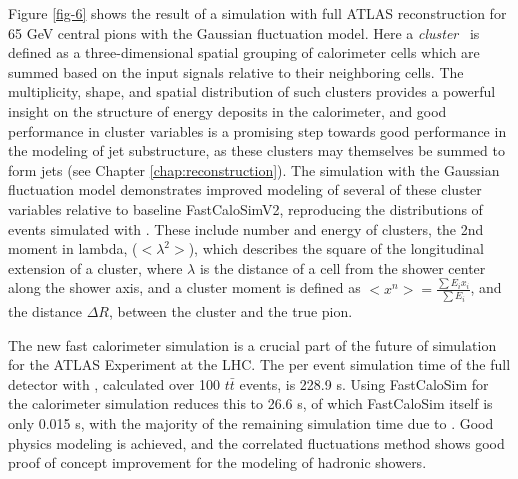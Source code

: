 Figure \ref{fig-6} shows the result of a simulation with full ATLAS reconstruction for 65 GeV central pions with 
the Gaussian fluctuation model. Here a \emph{cluster}~\cite{TopoCluster} is defined as a three-dimensional spatial 
grouping of calorimeter cells which are summed based on the input signals relative to their neighboring cells. 
The multiplicity, shape, and spatial distribution of such clusters provides a powerful insight on the structure of energy deposits 
in the calorimeter, and good performance in cluster variables is a promising step towards good performance in the 
modeling of jet substructure, as these clusters may themselves be summed to form jets (see Chapter \ref{chap:reconstruction}). 
The simulation with the Gaussian fluctuation model demonstrates improved modeling of several of these cluster variables 
relative to baseline FastCaloSimV2, reproducing the distributions of events simulated with \GEANT. These include number and 
energy of clusters, the 2nd moment in lambda, ($<\lambda^2>$), which describes the square of the longitudinal extension of a 
cluster, where $\lambda$ is the distance of a cell from the shower center along the shower axis, and a cluster moment is defined 
as $<x^n> =\frac{\sum E_{i}x_i}{\sum E_i}$, and the distance $\Delta R$, between the cluster and the true pion.

The new fast calorimeter simulation is a crucial part of the future of simulation for the ATLAS Experiment at the LHC. 
The per event simulation time of the full detector with \GEANT, calculated over 100 $t\bar{t}$ events, is 228.9 s. 
Using FastCaloSim for the calorimeter simulation reduces this to 26.6 s, of which FastCaloSim itself is only 0.015 s, 
with the majority of the remaining simulation time due to \GEANT.
Good physics modeling is achieved, and the correlated fluctuations method shows good proof of concept improvement for 
the modeling of hadronic showers.

\FloatBarrier
